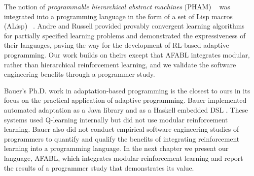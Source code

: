 The notion of {\em programmable hierarchical abstract machines} (PHAM) ~\cite{andre2001programmable} was integrated into a programming language in the form of a set of Lisp macros (ALisp) ~\cite{andre2002state}. Andre and Russell provided provably convergent learning algorithms for partially specified learning problems and demonstrated the expressiveness of their languages, paving the way for the development of RL-based adaptive programming. Our work builds on theirs except that AFABL integrates modular, rather than hierarchical reinforcement learning, and we validate the software engineering benefits through a programmer study.


Bauer's Ph.D. work in adaptation-based programming \cite{bauer2013adaptation} is the closest to ours in its focus on the practical application of adaptive programming. Bauer implemented  automated adaptation as a Java library \cite{bauer2011adaptation} and as a Haskell embedded DSL \cite{bauer2011adaptation-haskell}. These systems used Q-learning internally but did not use modular reinforcement learning. Bauer also did not conduct empirical software engineering studies of programmers to quantify and qualify the benefits of integrating reinforcement learning into a programming language. In the next chapter we present our language, AFABL, which integrates modular reinforcement learning and report the results of a programmer study that demonstrates its value.
